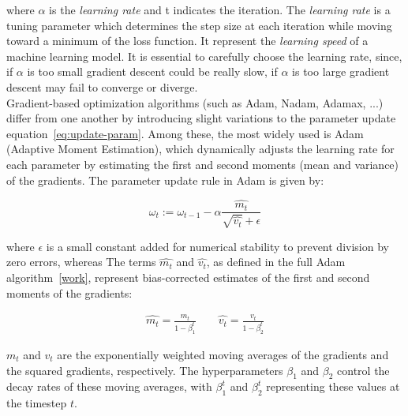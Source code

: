 where $\alpha$ is the \textit{learning rate} and t indicates the iteration.
The \textit{learning rate} is a tuning parameter which determines the step size at each iteration while moving toward a minimum of the loss function.
It represent the \textit{learning speed} of a machine learning model.
It is essential to carefully choose the learning rate, since, if $\alpha$ is too small gradient descent could be really slow, if $\alpha$ is 
too large gradient descent may fail to converge or diverge. \\
Gradient-based optimization algorithms (such as Adam, Nadam, Adamax, ...) differ from one another by introducing slight variations to the parameter 
update equation~\ref{eq:update-param}.
Among these, the most widely used is Adam (Adaptive Moment Estimation), which dynamically adjusts the learning rate for each parameter 
by estimating the first and second moments (mean and variance) of the gradients. The parameter update rule in Adam is given by:

\begin{equation}
    \omega_{t} := \omega_{t-1} - \alpha \frac{\hat{m_t}}{\sqrt{\hat{v_t}} + \epsilon} 
\end{equation}

where $\epsilon$ is a small constant added for numerical stability to prevent division by zero errors, whereas
The terms $\hat{m_t}$ and $\hat{v_t}$, as defined in the full Adam algorithm~\ref{work}, represent bias-corrected estimates of the first 
and second moments of the gradients:

\begin{align}
    \hat{m_t} = \frac{m_t}{1 - \beta_1^t}
    \qquad
    \hat{v_t} = \frac{v_t}{1 - \beta_2^t}
\end{align}

$m_t$ and $v_t$ are the exponentially weighted moving averages of the gradients and the squared gradients, respectively.
The hyperparameters $\beta_1$ and $\beta_2$ control the decay rates of these moving averages, with $\beta_1^t$ and $\beta_2^t$ representing 
these values at the timestep $t$.\\

